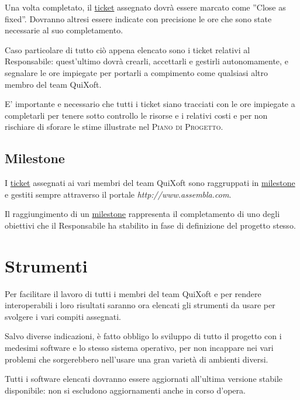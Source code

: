 \documentclass[11pt,a4paper]{article}
\begin{document}
Una volta completato, il \underline{ticket} assegnato dovrà essere marcato come ''Close as fixed''. Dovranno altresi essere indicate con precisione le ore che sono state necessarie al suo completamento.

Caso particolare di tutto ciò appena elencato sono i ticket relativi al Responsabile: quest'ultimo dovrà crearli, accettarli e gestirli autonomamente, e segnalare le ore impiegate per portarli a compimento come qualsiasi altro membro del team QuiXoft.

E' importante e necessario che tutti i ticket siano tracciati con le ore impiegate a completarli per tenere sotto controllo le risorse e i relativi costi e per non rischiare di sforare le stime illustrate nel \textsc{Piano di Progetto}.
\subsection{Milestone}
I \underline{ticket} assegnati ai vari membri del team QuiXoft sono raggruppati in \underline{milestone} e gestiti sempre attraverso il portale \textit{http://www.assembla.com}.

Il raggiungimento di un \underline{milestone} rappresenta il completamento di uno degli obiettivi che il Responsabile ha stabilito in fase di definizione del progetto stesso.
\section{Strumenti}
Per facilitare il lavoro di tutti i membri del team QuiXoft e per rendere interoperabili i loro risultati saranno ora elencati gli strumenti da usare per svolgere i vari compiti assegnati.

Salvo diverse indicazioni, è fatto obbligo lo sviluppo di tutto il progetto con i medesimi software e lo stesso sistema operativo, per non incappare nei vari problemi che sorgerebbero nell'usare una gran varietà di ambienti diversi.

Tutti i software elencati dovranno essere aggiornati all'ultima versione stabile disponibile: non si escludono aggiornamenti anche in corso d'opera.
\end{document}
